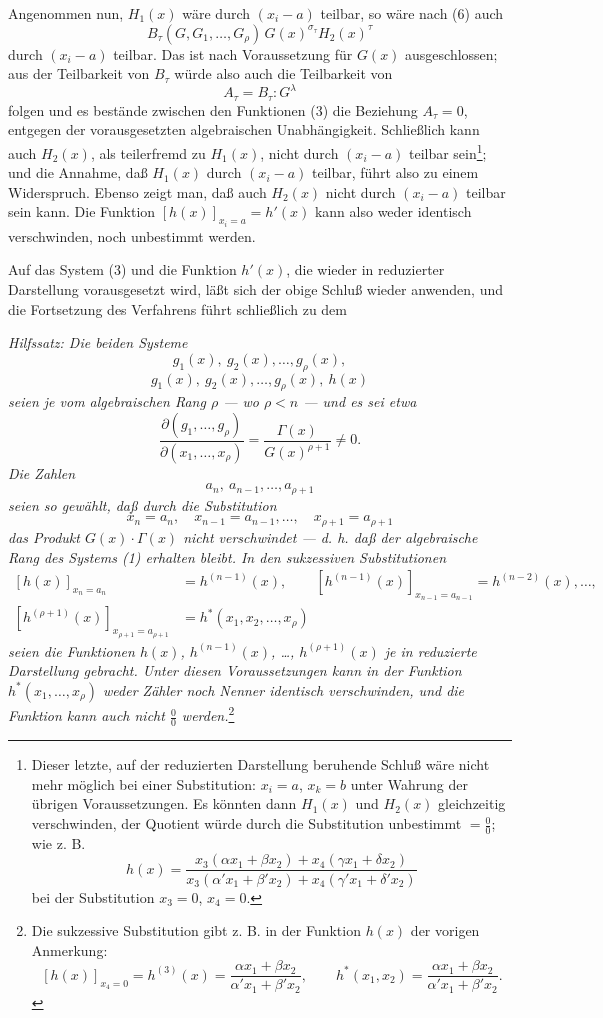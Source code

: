 \documentclass[11pt]{article}
\begin{document}
Angenommen nun, $H_1(x)$ wäre durch $(x_i-a)$ teilbar, so wäre nach (6) auch
\[
  B_\tau(G,G_1,\ldots,G_\rho)\,G(x)^{\sigma_\tau}H_2(x)^\tau
\]
durch $(x_i-a)$ teilbar. Das ist nach Voraussetzung für $G(x)$ ausgeschlossen; aus der Teilbarkeit von $B_\tau$ würde also auch die Teilbarkeit von
\[
  A_\tau=B_\tau:G^\lambda
\]
folgen und es bestände zwischen den Funktionen (3) die Beziehung $A_\tau=0$, entgegen der vorausgesetzten algebraischen Unabhängigkeit. Schließlich kann auch $H_2(x)$, als teilerfremd zu $H_1(x)$, nicht durch $(x_i-a)$ teilbar sein\footnote{Dieser letzte, auf der reduzierten Darstellung beruhende Schluß wäre nicht mehr möglich bei einer Substitution: $x_i=a$, $x_k=b$ unter Wahrung der übrigen Voraussetzungen. Es könnten dann $H_1(x)$ und $H_2(x)$ gleichzeitig verschwinden, der Quotient würde durch die Substitution unbestimmt $=\frac{0}{0}$; wie z. B.
\[
 h(x)=\frac{x_3(\alpha x_1+\beta x_2)+x_4(\gamma x_1+\delta x_2)}
 {x_3(\alpha' x_1+\beta' x_2)+x_4(\gamma' x_1+\delta' x_2)}
\]
bei der Substitution $x_3=0$, $x_4=0$.}; und die Annahme, daß $H_1(x)$ durch $(x_i-a)$ teilbar, führt also zu einem Widerspruch. Ebenso zeigt man, daß auch $H_2(x)$ nicht durch $(x_i-a)$ teilbar sein kann. Die Funktion $[h(x)]_{x_i=a}=h'(x)$ kann also weder identisch verschwinden, noch unbestimmt werden.

Auf das System (3) und die Funktion $h'(x)$, die wieder in reduzierter Darstellung vorausgesetzt wird, läßt sich der obige Schluß wieder anwenden, und die Fortsetzung des Verfahrens führt schließlich zu dem

\emph{Hilfssatz: Die beiden Systeme}
\[
  g_1(x),\ g_2(x),\ldots,g_\rho(x),
\]
\[
  g_1(x),\ g_2(x),\ldots,g_\rho(x),\ h(x)
\]
\emph{seien je vom algebraischen Rang $\rho$ --- wo $\rho<n$ --- und es sei etwa}
\[
 \frac{\partial(g_1,\ldots,g_\rho)}{\partial(x_1,
\ldots,x_\rho)}
 =\frac{\Gamma(x)}{G(x)^{\rho+1}}\ne0.
\]
\emph{Die Zahlen}
\[
  a_n,
\ a_{n-1},\ldots,a_{\rho+1}
\]
\emph{seien so gewählt, daß durch die Substitution}
\[
  x_n=a_n,\quad x_{n-1}=a_{n-1},\ldots,\quad x_{\rho+1}=a_{\rho+1}
\]
\emph{das Produkt $G(x)\cdot\Gamma(x)$ nicht verschwindet --- d. h. daß der algebraische Rang des Systems (1) erhalten bleibt. In den sukzessiven Substitutionen}
\[
\begin{aligned}
 [h(x)]_{x_n=a_n}&=h^{(n-1)}(x),\qquad
 [h^{(n-1)}(x)]_{x_{n-1}=a_{n-1}}=h^{(n-2)}(x),\ldots,\\
 [h^{(\rho+1)}(x)]_{x_{\rho+1}=a_{\rho+1}}&=h^*(x_1,x_2,\ldots,x_\rho)
\end{aligned}
\]
\emph{seien die Funktionen $h(x)$, $h^{(n-1)}(x)$, \ldots, $h^{(\rho+1)}(x)$ je in reduzierte Darstellung gebracht. Unter diesen Voraussetzungen kann in der Funktion $h^*(x_1,\ldots,x_\rho)$ weder Zähler noch Nenner identisch verschwinden, und die Funktion kann auch nicht $\frac{0}{0}$ werden.}\footnote{Die sukzessive Substitution gibt z. B. in der Funktion $h(x)$ der vorigen Anmerkung:
\[
 [h(x)]_{x_4=0}=h^{(3)}(x)=\frac{\alpha x_1+\beta x_2}{\alpha' x_1+\beta' x_2},\qquad
 h^*(x_1,x_2)=\frac{\alpha x_1+\beta x_2}{\alpha' x_1+\beta' x_2}.
\]}
\end{document}
